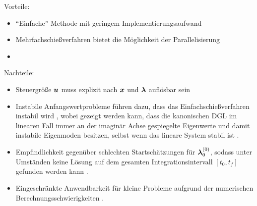 \begin{multicols}{2}
	Vorteile:
	\begin{itemize}
		\item ``Einfache'' Methode mit geringem Implementierungsaufwand \cite{Ascher.1995c4}
		\item Mehrfachschießverfahren bietet die Möglichkeit der Parallelisierung \cite{Betts.1998}\vspace{\fill}
		\item[\vspace{\fill}]
	\end{itemize}
	
	\columnbreak
	
	Nachteile:
	\begin{itemize}
		\item Steuergröße $\boldsymbol{u}$ muss explizit nach $\boldsymbol{x}$ und $\boldsymbol{\lambda}$ auflösbar sein \cite{Papageorgiou.2012}\vspace{\fill}
		\item Instabile Anfangswertprobleme führen dazu, dass das Einfachschießverfahren instabil wird \cite{Ascher.1995c4}, wobei gezeigt werden kann, dass die kanonischen \gls{DGL} im linearen Fall immer an der imaginär Achse gespiegelte Eigenwerte und damit instabile Eigenmoden besitzen, selbst wenn das lineare System stabil ist \cite{KnutGraichen.2012}. 
		\item Empfindlichkeit gegenüber schlechten Startschätzungen für $\boldsymbol{\lambda}_0^{(0)}$, sodass unter Umständen keine Lösung auf dem gesamten Integrationsintervall $[t_0, t_f]$ gefunden werden kann \cite{Ascher.1995c4}.
		\item Eingeschränkte Anwendbarkeit für kleine Probleme aufgrund der numerischen Berechnungsschwierigkeiten \cite{Papageorgiou.2012}.
	\end{itemize}
\end{multicols}


